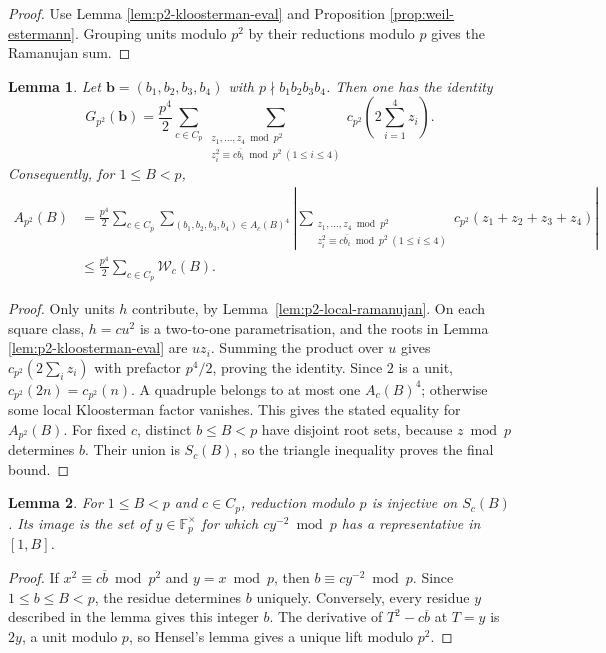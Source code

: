\documentclass[12pt, a4paper]{amsart}
\numberwithin{equation}{section}
\newcommand{\F}{\mathbb{F}}
\renewcommand{\bar}[1]{\overline{#1}}
\renewcommand{\le}{\leqslant}
\theoremstyle{plain}
\newtheorem{lem}{Lemma}[section]
\begin{document}
\begin{proof}
Use Lemma \ref{lem:p2-kloosterman-eval} and Proposition \ref{prop:weil-estermann}. Grouping units modulo $p^2$ by their reductions modulo $p$ gives the Ramanujan sum.
\end{proof}

\begin{lem}\label{lem:p2-root-reduction}
Let $\mathbf b=(b_1,b_2,b_3,b_4)$ with $p\nmid b_1b_2b_3b_4$. Then one has the identity
$$
G_{p^2}(\mathbf b)
=
\frac{p^4}{2}\sum_{c\in C_p}
\sum_{\substack{z_1,\ldots,z_4\bmod p^2\\
z_i^2\equiv c\overline{b_i}\bmod {p^2}\ (1\le i\le4)}}
c_{p^2}\left(2\sum_{i=1}^4z_i\right).
$$
Consequently, for $1\le B<p$,
$$
\begin{aligned}
A_{p^2}(B)
&=\frac{p^4}{2}\sum_{c\in C_p}
\sum_{(b_1,b_2,b_3,b_4)\in A_c(B)^4}
\left|
\sum_{\substack{z_1,\ldots,z_4\bmod p^2\\
z_i^2\equiv c\overline{b_i}\bmod {p^2}\ (1\le i\le4)}}
c_{p^2}(z_1+z_2+z_3+z_4)
\right|\\
&\le \frac{p^4}{2}\sum_{c\in C_p}\mathcal W_c(B).
\end{aligned}
$$
\end{lem}

\begin{proof}
Only units $h$ contribute, by Lemma~\ref{lem:p2-local-ramanujan}. On each square class, $h=cu^2$ is a two-to-one parametrisation, and the roots in Lemma \ref{lem:p2-kloosterman-eval} are $uz_i$. Summing the product over $u$ gives $c_{p^2}(2\sum_iz_i)$ with prefactor $p^4/2$, proving the identity. Since $2$ is a unit, $c_{p^2}(2n)=c_{p^2}(n)$. A quadruple belongs to at most one $A_c(B)^4$; otherwise some local Kloosterman factor vanishes. This gives the stated equality for $A_{p^2}(B)$. For fixed $c$, distinct $b\le B<p$ have disjoint root sets, because $z\bmod p$ determines $b$. Their union is $S_c(B)$, so the triangle inequality proves the final bound.
\end{proof}

\begin{lem}\label{lem:root-reduction-bijection}
For $1\le B<p$ and $c\in C_p$, reduction modulo $p$ is injective on $S_c(B)$. Its image is the set of $y\in\F_p^\times$ for which $cy^{-2}\bmod p$ has a representative in $[1,B]$.
\end{lem}

\begin{proof}
If $x^2\equiv c\bar{b}\bmod {p^2}$ and $y=x\bmod p$, then $b\equiv cy^{-2}\bmod p$. Since $1\le b\le B<p$, the residue determines $b$ uniquely. Conversely, every residue $y$ described in the lemma gives this integer $b$. The derivative of $T^2-c\bar{b}$ at $T=y$ is $2y$, a unit modulo $p$, so Hensel's lemma gives a unique lift modulo $p^2$.
\end{proof}
\end{document}
